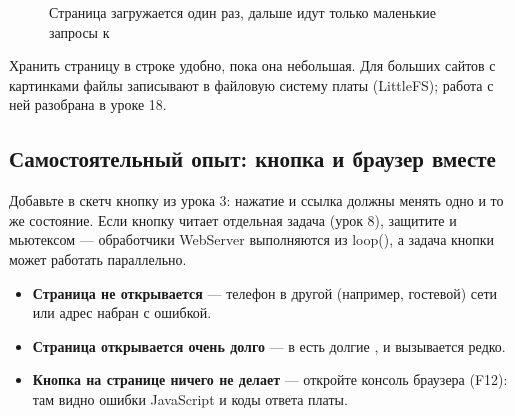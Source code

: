 \begin{figure}[H]
\centering
{}
\caption{Страница загружается один раз, дальше идут только маленькие запросы к }
\end{figure}

\begin{tip}
Хранить страницу в строке  удобно, пока она небольшая. Для больших сайтов с картинками
файлы записывают в файловую систему платы (LittleFS); работа с ней разобрана в уроке 18.
\end{tip}


\subsection{Самостоятельный опыт: кнопка и браузер вместе}

Добавьте в скетч кнопку из урока 3: нажатие и ссылка  должны менять одно и то же
состояние. Если кнопку читает отдельная задача (урок 8), защитите  и 
мьютексом --- обработчики WebServer выполняются из loop(), а задача кнопки может работать параллельно.

\begin{trouble}
\begin{itemize}[leftmargin=*]
  \item \textbf{Страница не открывается} --- телефон в другой (например, гостевой) сети или адрес набран с ошибкой.
  \item \textbf{Страница открывается очень долго} --- в  есть долгие , и  вызывается редко.
  \item \textbf{Кнопка на странице ничего не делает} --- откройте консоль браузера (F12): там видно ошибки JavaScript и коды ответа платы.
\end{itemize}
\end{trouble}

